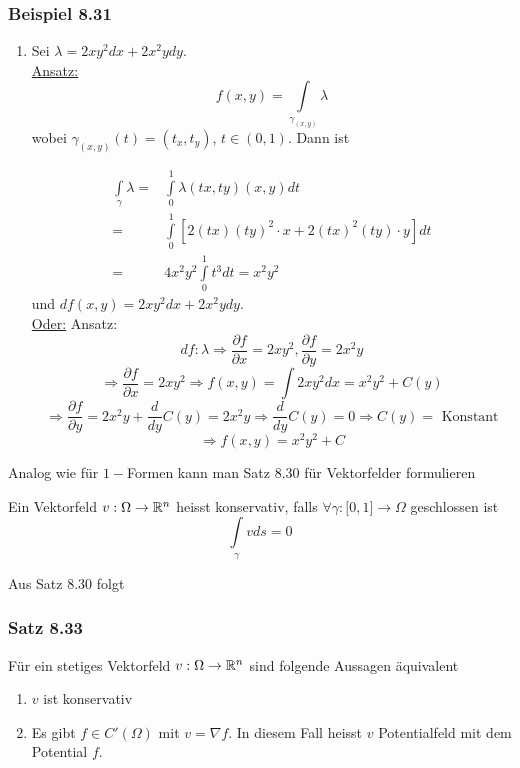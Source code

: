 \subsubsection*{Beispiel 8.31}
\begin{enumerate}
\item Sei $\lambda = 2xy^2dx+2x^2ydy$. \\

\noindent\underline{Ansatz:} \[f\left(x,y\right)=\int\limits_{\gamma_{\left( x,y\right)}}\lambda\]
wobei $\gamma_{\left( x,y\right)}\left(t\right)=\left(t_x,t_y\right)$, $t\in\left( 0,1\right)$. Dann ist

\begin{align*}
\int\limits_\gamma  \lambda   = &\int\limits_0^1 {\lambda \left( {tx,ty} \right)\left( {x,y} \right)dt} \\
= &\int\limits_0^1 {\left[ {2\left( {tx} \right){{\left( {ty} \right)}^2} \cdot x + 2{{\left( {tx} \right)}^2}\left( {ty} \right) \cdot y} \right]dt} \\
= & 4{x^2}{y^2}\int\limits_0^1 {{t^3}} dt = {x^2}{y^2}
\end{align*}
und $df\left( x,y\right)=2xy^2dx+2x^2ydy$.\\

\noindent\underline{Oder:} Ansatz:
\[df:\lambda \Rightarrow\frac{\partial f}{\partial x}=  2xy^2, \frac{\partial f}{\partial y}=  2x^2y\]
\[\Rightarrow \frac{\partial f}{\partial x}=2xy^2 \Rightarrow f\left( x,y \right) = \int 2xy^2 dx =  x^2y^2+C\left( y\right)\]
\[\Rightarrow\frac{\partial f}{\partial y}=2x^2y+\frac{d}{dy}C\left(y\right)=2x^2y \Rightarrow \frac{d}{dy}C\left( y\right) =  0 \Rightarrow C\left( y\right) = \text{ Konstant}\]
\[\Rightarrow f\left( x,y\right)=  x^2y^2+C\]
\end{enumerate}
Analog wie für $1-$Formen kann man Satz 8.30 für Vektorfelder formulieren

\begin{definition}{8.32}
Ein Vektorfeld $v:\Omega\to\mathbb{R}^n$ heisst konservativ, falls $\forall\gamma:\lbrack 0,1\rbrack\to\Omega$ geschlossen ist \[\int\limits_\gamma v ds=0\]
\end{definition}
Aus Satz 8.30 folgt
\subsubsection*{Satz 8.33}
Für ein stetiges Vektorfeld $v:\Omega\to\mathbb{R}^n$ sind folgende Aussagen äquivalent
\begin{enumerate}
\item $v$ ist konservativ
\item Es gibt $f\in C'\left( \Omega\right)$ mit $v=\nabla f$. In diesem Fall heisst $v$ Potentialfeld mit dem Potential $f$.
\end{enumerate}

